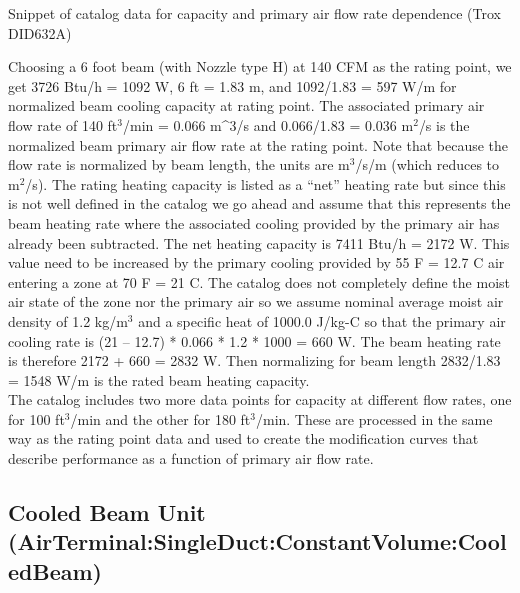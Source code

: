 Snippet of catalog data for capacity and primary air flow rate dependence (Trox DID632A)

Choosing a 6 foot beam (with Nozzle type H) at 140 CFM as the rating point, we get 3726 Btu/h = 1092 W, 6 ft = 1.83 m, and 1092/1.83 = 597 W/m for normalized beam cooling capacity at rating point. The associated primary air flow rate of 140 ft\(^{3}\)/min = 0.066 m\^{}3/s and 0.066/1.83 = 0.036 m\(^{2}\)/s is the normalized beam primary air flow rate at the rating point. Note that because the flow rate is normalized by beam length, the units are m\(^{3}\)/s/m (which reduces to m\(^{2}\)/s). The rating heating capacity is listed as a ``net'' heating rate but since this is not well defined in the catalog we go ahead and assume that this represents the beam heating rate where the associated cooling provided by the primary air has already been subtracted. The net heating capacity is 7411 Btu/h = 2172 W. This value need to be increased by the primary cooling provided by 55 F = 12.7 C air entering a zone at 70 F = 21 C. The catalog does not completely define the moist air state of the zone nor the primary air so we assume nominal average moist air density of 1.2 kg/m\(^{3}\) and a specific heat of 1000.0 J/kg-C so that the primary air cooling rate is (21 -- 12.7) * 0.066 * 1.2 * 1000 = 660 W. The beam heating rate is therefore 2172 + 660 = 2832 W. Then normalizing for beam length 2832/1.83 = 1548 W/m is the rated beam heating capacity.\\
The catalog includes two more data points for capacity at different flow rates, one for 100 ft\(^{3}\)/min and the other for 180 ft\(^{3}\)/min. These are processed in the same way as the rating point data and used to create the modification curves that describe performance as a function of primary air flow rate.

\subsection{Cooled Beam Unit (AirTerminal:SingleDuct:ConstantVolume:CooledBeam)}\label{cooled-beam-unit-airterminalsingleductconstantvolumecooledbeam}

